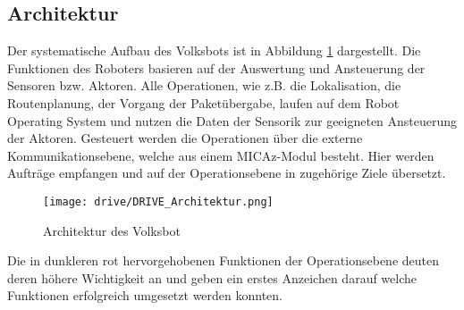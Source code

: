 \subsection{Architektur}

Der systematische Aufbau des Volksbots ist in Abbildung \ref{fig:architecture_volksbot} dargestellt. Die Funktionen des Roboters basieren auf der Auswertung und Ansteuerung der Sensoren bzw. Aktoren. Alle Operationen, wie z.B. die Lokalisation, die Routenplanung, der Vorgang der Paketübergabe, laufen auf dem Robot Operating System und nutzen die Daten der Sensorik zur geeigneten Ansteuerung der Aktoren. Gesteuert werden die Operationen über die externe Kommunikationsebene, welche aus einem MICAz-Modul besteht. Hier werden Aufträge empfangen und auf der Operationsebene in zugehörige Ziele übersetzt.

\begin{figure}[h!]
 \centering
		\texttt{[image: drive/DRIVE\_Architektur.png]}
	\caption{Architektur des Volksbot}
	\label{fig:architecture_volksbot}
\end{figure}

Die in dunkleren rot hervorgehobenen Funktionen der Operationsebene deuten deren höhere Wichtigkeit an und geben ein erstes Anzeichen darauf welche Funktionen erfolgreich umgesetzt werden konnten.